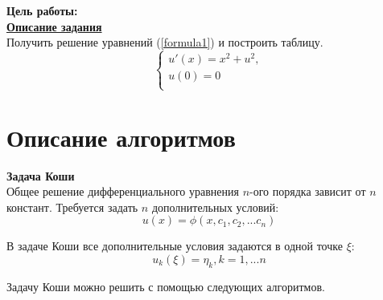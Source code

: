 \textbf{Цель работы:}\\

\underline{\textbf{Описание задания}}\\

Получить решение уравнений (\ref{formula1}) и построить таблицу.
\begin{equation}\label{formula1}
	\left\{
	\begin{array}{ccc}
		u'(x) = x^2 + u^2,\\
		u(0) = 0\\
	\end{array}
	\right.
\end{equation}


\section*{Описание алгоритмов}
\textbf{Задача Коши}\\
Общее решение дифференциального уравнения $n$-ого порядка зависит от $n$ констант. Требуется задать $n$ дополнительных условий:
\begin{equation}\label{formula2}
	u(x) = \phi(x, c_1, c_2, ... c_n)
\end{equation}

В задаче Коши все дополнительные условия задаются в одной точке $\xi$:
\begin{equation}\label{formula3}
	u_k(\xi) = \eta_k, k = 1,...n
\end{equation}

Задачу Коши можно решить с помощью следующих алгоритмов. \\
